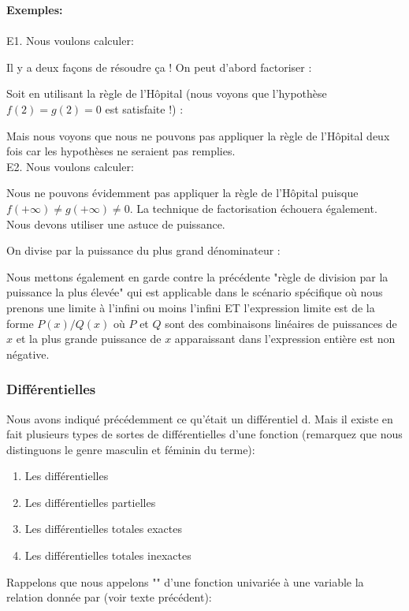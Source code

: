 	\begin{tcolorbox}[colframe=black,colback=white,sharp corners]
	\textbf{{\Large {}}Exemples:}\\\\
	E1. Nous voulons calculer:
	
	Il y a deux façons de résoudre ça ! On peut d'abord factoriser :
	
	Soit en utilisant la règle de l'Hôpital (nous voyons que l'hypothèse $f(2)=g(2)=0$ est satisfaite !) :
	
	Mais nous voyons que nous ne pouvons pas appliquer la règle de l'Hôpital deux fois car les hypothèses ne seraient pas remplies.\\
	
	E2. Nous voulons calculer:
	
	Nous ne pouvons évidemment pas appliquer la règle de l'Hôpital puisque $f(+\infty)\neq g(+\infty) \neq 0$. La technique de factorisation échouera également. Nous devons utiliser une astuce de puissance.
	\end{tcolorbox}
	
	\begin{tcolorbox}[colframe=black,colback=white,sharp corners]
	On divise par la puissance du plus grand dénominateur : 
	
	\end{tcolorbox}
	Nous mettons également en garde contre la précédente "règle de division par la puissance la plus élevée" qui est applicable dans le scénario spécifique où nous prenons une limite à l'infini ou moins l'infini ET l'expression limite est de la forme $P(x)/Q(x)$ où $P$ et $Q$ sont des combinaisons linéaires de puissances de $x$ et la plus grande puissance de $x$ apparaissant dans l'expression entière est non négative.
	
	\subsubsection{Différentielles}
	
	Nous avons indiqué précédemment ce qu'était un différentiel $\mathrm{d}$. Mais il existe en fait plusieurs types de sortes de différentielles d'une fonction (remarquez que nous distinguons le genre masculin et féminin du terme):
	\begin{enumerate}
		\item Les différentielles
		\item Les différentielles partielles
		\item Les différentielles totales exactes 
		\item Les différentielles totales inexactes 
	\end{enumerate}
	Rappelons que nous appelons "\label{differential}" d'une fonction univariée à une variable la relation donnée par (voir texte précédent):
	
